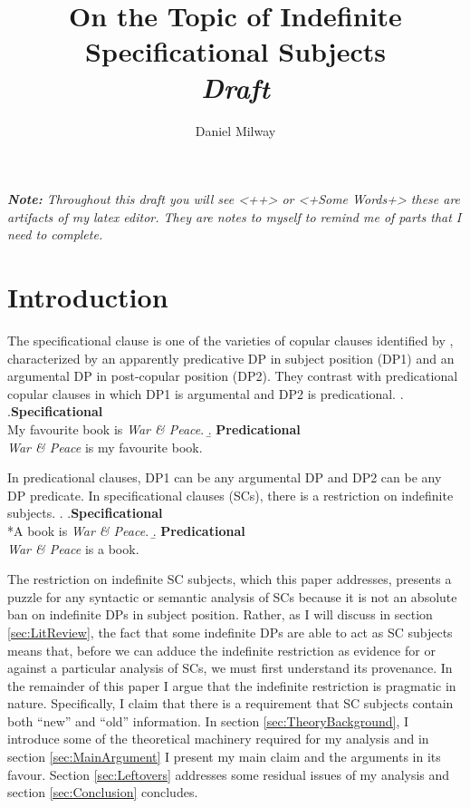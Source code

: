 \documentclass[letterpaper]{article}
\title{On the Topic of Indefinite Specificational Subjects\\\textit{Draft}}
\author{Daniel Milway}
\begin{document}
\maketitle
\doublespacing
\textit{\textbf{Note:} Throughout this draft you will see <++> or <+Some Words+> these are artifacts of my latex editor.
They are notes to myself to remind me of parts that I need to complete.
}
\section{Introduction}
The specificational clause is one of the varieties of copular clauses identified by \textcite{higgins1973pseudo}, characterized by an apparently predicative DP in subject position (DP1) and an argumental DP in post-copular position (DP2).
They contrast with predicational copular clauses in which DP1 is argumental and DP2 is predicational.
\ex.
\a.\textbf{Specificational}\\
My favourite book is \textit{War \& Peace}.
\b. \textbf{Predicational}\\
\textit{War \& Peace} is my favourite book.

In predicational clauses, DP1 can be any argumental DP and DP2 can be any DP predicate.
In specificational clauses (SCs), there is a restriction on indefinite subjects.
\ex.
\a.\textbf{Specificational}\\
*A book is \textit{War \& Peace}.
\b. \textbf{Predicational}\\
\textit{War \& Peace} is a book.

The restriction on indefinite SC subjects, which this paper addresses, presents a puzzle for any syntactic or semantic analysis of SCs because it is not an absolute ban on indefinite DPs in subject position. 
Rather, as I will discuss in section \ref{sec:LitReview}, the fact that some indefinite DPs are able to act as SC subjects means that, before we can adduce the indefinite restriction as evidence for or against a particular analysis of SCs, we must first understand its provenance.
In the remainder of this paper I argue that the indefinite restriction is pragmatic in nature.
Specifically, I claim that there is a requirement that SC subjects contain both ``new'' and ``old'' information.
In section \ref{sec:TheoryBackground}, I introduce some of the theoretical machinery required for my analysis and in section \ref{sec:MainArgument} I present my main claim and the arguments in its favour.
Section \ref{sec:Leftovers} addresses some residual issues of my analysis and section \ref{sec:Conclusion} concludes.
\end{document}
